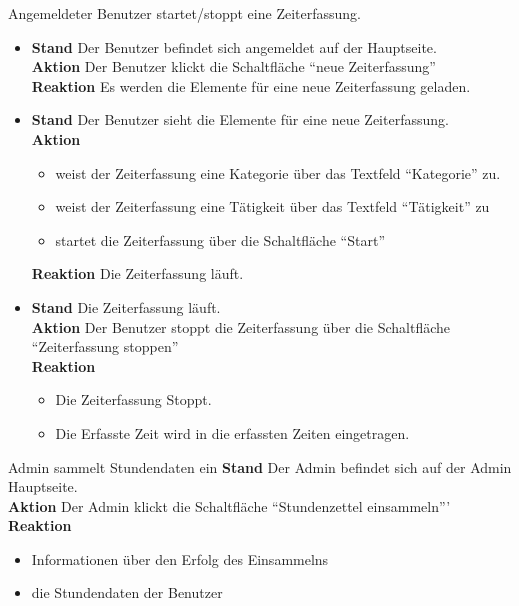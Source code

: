 \begin{requirements}
\begin{itemize}
	\end{itemize}
	 Angemeldeter Benutzer startet/stoppt eine Zeiterfassung.
	\begin{itemize}
	    \item
            \textbf{Stand} Der Benutzer befindet sich angemeldet auf der Hauptseite. \\
            \textbf{Aktion} Der Benutzer klickt die Schaltfläche "`neue Zeiterfassung"' \\
            \textbf{Reaktion} Es werden die Elemente für eine neue Zeiterfassung geladen.
            \item
                \textbf{Stand} Der Benutzer sieht die Elemente für eine neue Zeiterfassung. \\
                \textbf{Aktion}
                    \begin{itemize} Der Benutzer
                        \item weist der Zeiterfassung eine Kategorie über das Textfeld "`Kategorie"' zu.
                        \item weist der Zeiterfassung eine Tätigkeit über das Textfeld "`Tätigkeit"' zu
                        \item startet die Zeiterfassung über die Schaltfläche "`Start"'
                    \end{itemize}
                \textbf{Reaktion} Die Zeiterfassung läuft.
        \item
            \textbf{Stand} Die Zeiterfassung läuft. \\
            \textbf{Aktion} Der Benutzer stoppt die Zeiterfassung über die Schaltfläche "`Zeiterfassung stoppen"' \\
            \textbf{Reaktion}
                \begin{itemize}
                    \item Die Zeiterfassung Stoppt.
                    \item Die Erfasste Zeit wird in die erfassten Zeiten eingetragen.
                \end{itemize}
	\end {itemize}


	 Admin sammelt Stundendaten ein
            \textbf{Stand} Der Admin befindet sich auf der Admin Hauptseite. \\
            \textbf{Aktion} Der Admin klickt die Schaltfläche "`Stundenzettel einsammeln"'' \\
            \textbf{Reaktion}
                \begin{itemize} Der Admin erhält
                    \item Informationen über den Erfolg des Einsammelns
                    \item die Stundendaten der Benutzer
                \end{itemize}


\end{requirements}
